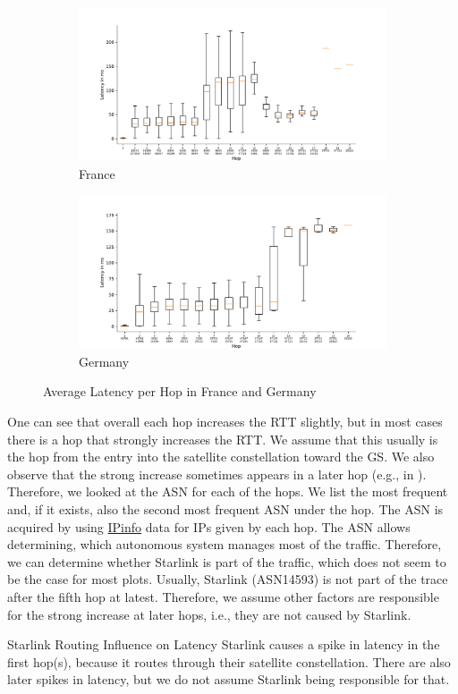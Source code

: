 \begin{figure}
	\centering
	\begin{subfigure}[b]{\linewidth}
		\includegraphics[width=\linewidth]{chapters/4-results/traceroute/img/latency-per-hop-FR-5001.pdf}
		\caption{France}
	\end{subfigure}
	\begin{subfigure}[b]{\linewidth}
		\includegraphics[width=\linewidth]{chapters/4-results/traceroute/img/latency-per-hop-DE-5001.pdf}
		\caption{Germany}
	\end{subfigure}
	\caption{Average Latency per Hop in France and Germany}
	\label{fig:latency-change-per-hop-2}
\end{figure}

One can see that overall each hop increases the RTT slightly, but in most cases
there is a hop that strongly increases the RTT. We assume that this usually is
the hop from the entry into the satellite constellation toward the \ac{GS}. We
also observe that the strong increase sometimes appears in a later hop (e.g.,
in ). Therefore, we looked at the
\ac{ASN} for each of the hops. We list the most frequent and, if it exists,
also the second most frequent \ac{ASN} under the hop. The \ac{ASN} is acquired
by using \href{https://ipinfo.io/}{IPinfo} data for IPs given by each hop. The
\ac{ASN} allows determining, which autonomous system manages most of the
traffic. Therefore, we can determine whether Starlink is part of the traffic,
which does not seem to be the case for most plots. Usually, Starlink
(\ac{ASN}14593) is not part of the trace after the fifth hop at latest.
Therefore, we assume other factors are responsible for the strong increase at
later hops, i.e., they are not caused by Starlink.

\begin{takeaway}{Starlink Routing Influence on Latency}
	Starlink causes a spike in latency in the first hop(s), because it
	routes through their satellite constellation. There are also later
	spikes in latency, but we do not assume Starlink being responsible for
	that.
\end{takeaway}
